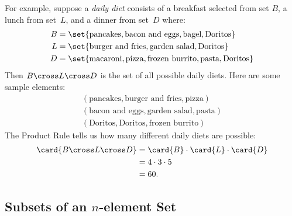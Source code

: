 For example, suppose a \emph{daily diet}
consists of a breakfast selected from set $B$, a lunch from set~$L$,
and a dinner from set~$D$ where:
%
\begin{align*}
B & = \set{\text{pancakes},
      	   \text{bacon and eggs},
           \text{bagel},
           \text{Doritos}} \\
L & = \set{\text{burger and fries},
           \text{garden salad},
           \text{Doritos}} \\
D & = \set{\text{macaroni},
           \text{pizza},
           \text{frozen burrito},
           \text{pasta},
           \text{Doritos}}
\end{align*}
%
Then $B \cross L \cross D$ is the set of all possible daily diets.
Here are some sample elements:
%
\begin{gather*}
(\text{pancakes}, \text{burger and fries}, \text{pizza}) \\
(\text{bacon and eggs}, \text{garden salad}, \text{pasta}) \\
(\text{Doritos}, \text{Doritos}, \text{frozen burrito})
\end{gather*}
%
The Product Rule tells us how many different daily diets are possible:
%
\begin{align*}
\card{B \cross L \cross D}
    & = \card{B} \cdot \card{L} \cdot \card{D} \\
    & = 4 \cdot 3 \cdot 5 \\
    & = 60.
\end{align*}

\subsection{Subsets of an $n$-element Set}\label{2nsubsets}

\iffalse

How many different subsets of an $n$-element set $X$ are there?  For
example, the set $X = \set{x_1, x_2, x_3}$ has eight different subsets:
%
\[
\begin{array}{cccc}
\emptyset & \set{x_1} & \set{x_2} & \set{x_1, x_2} \\
\set{x_3} & \set{x_1, x_3} & \set{x_2, x_3} & \set{x_1, x_2, x_3}.
\end{array}
\]

There is a natural bijection from subsets of $X$ to $n$-bit sequences.
Let $x_1, x_2, \ldots, x_n$ be the elements of $X$.  Then a particular
subset of $X$ maps to the sequence $(b_1, \ldots, b_n)$ where $b_i =
1$ if and only if $x_i$ is in that subset.  For example, if $n = 10$,
then the subset $\set{x_2, x_3, x_5, x_7, x_{10}}$ maps to a 10-bit
sequence as follows:
%
\[
\begin{array}{rrrrrrrrrrrrr}
\text{subset:} &
\{ &    & x_2, & x_3, &    & x_5, &   & x_7, &    &    & x_{10} & \} \\
\text{sequence:} &
(  & 0, &   1, &   1, & 0, &   1, & 0, &   1, & 0, & 0, &        1 & )
\end{array}
\]
\fi

